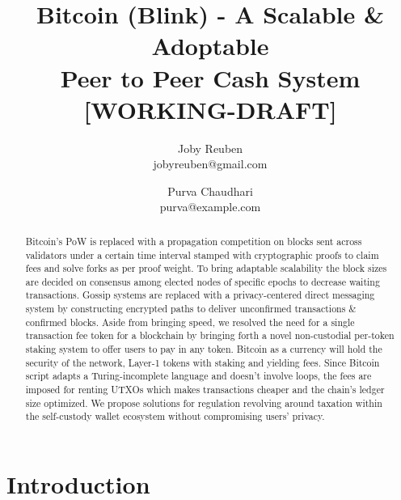 \documentclass[a4paper,11pt]{article}
\title{
 \Large \textbf{Bitcoin (Blink) - A Scalable \& Adoptable \\
Peer to Peer Cash System}\\
\vspace{3mm}
\scriptsize [WORKING-DRAFT]
}
\author{ \myfontt Joby Reuben \\ \myfontt jobyreuben@gmail.com \and  \myfontt Purva Chaudhari \\ \myfontt purva@example.com}
\date{}
\begin{document}
\maketitle
\begin{abstract}
Bitcoin's PoW is replaced with a propagation competition on blocks sent across validators under a certain time interval stamped with cryptographic proofs to claim fees and solve forks as per proof weight. To bring adaptable scalability the block sizes are decided on consensus among elected nodes of specific epochs to decrease waiting transactions. Gossip systems are replaced with a privacy-centered direct messaging system by constructing encrypted paths to deliver unconfirmed transactions \& confirmed blocks. Aside from bringing speed, we resolved the need for a single transaction fee token for a blockchain by bringing forth a novel non-custodial per-token staking system to offer users to pay in any token. Bitcoin as a currency will hold the security of the network, Layer-1 tokens with staking and yielding fees. Since Bitcoin script adapts a Turing-incomplete language and doesn't involve loops, the fees are imposed for renting UTXOs which makes transactions cheaper and the chain's ledger size optimized. We propose solutions for regulation revolving around taxation within the self-custody wallet ecosystem without compromising users' privacy. 

\end{abstract}

\section{Introduction}
\end{document}
